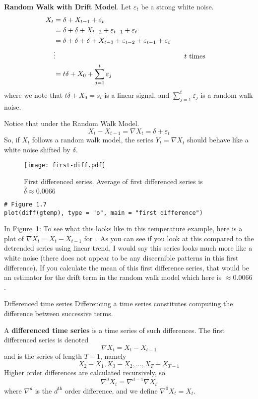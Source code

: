 \textbf{Random Walk with Drift Model}. Let $ \varepsilon_t $ be a strong white noise.
\begin{align*}
    X_t
     & =\delta+X_{t-1}+\varepsilon_t                                                                                  \\
     & =\delta+\delta+X_{t-2}+\varepsilon_{t-1}+\varepsilon_t                                                         \\
     & =\delta+\delta+\delta+X_{t-3}+\varepsilon_{t-2}+\varepsilon_{t-1}+\varepsilon_{t}                              \\
     & \vdots                                                                            & \quad & \text{$ t $ times} \\
     & =t\delta+X_0+\sum_{j=1}^{t} \varepsilon_j
\end{align*}
where we note that $ t\delta+X_0=s_t $ is a linear signal,
and $ \sum_{j=1}^{t} \varepsilon_j $ is a
random walk noise.

Notice that under the Random Walk Model.
\[ X_t-X_{t-1}=\nabla X_t=\delta+\varepsilon_t \]
So, if $ X_t $ follows a random walk model, the series $ Y_t=\nabla X_t $
should behave like a white noise shifted by $ \delta $.
\begin{figure}[!htbp]
    \centering
    \texttt{[image: first-diff.pdf]}
    \caption{First differenced series. Average of first differenced series
        is $ \hat{\delta}\approx 0.0066 $}\label{fig:firstdiff}
\end{figure}
\begin{verbatim}
# Figure 1.7
plot(diff(gtemp), type = "o", main = "first difference")
\end{verbatim}
In Figure~\ref{fig:firstdiff}:
{\color{blue}To see what this looks like in this temperature example, here is a plot
of $ \nabla X_t=X_t-X_{t-1} $ for~. As you can
see if you look at this compared to the detrended series using linear trend,
I would say this series looks much more like a white noise (there does not
appear to be any discernible patterns in this first difference). If you calculate the mean
of this first difference series, that would be an estimator for the drift term
in the random walk model which here is $ \approx 0.0066 $.}

\begin{Definition}{Differenced time series}{}
    Differencing a time series constitutes
    computing the difference between successive terms.

    A \textbf{differenced time series} is a time series of such differences.
    The first differenced series is denoted
    \[ \nabla X_t=X_t-X_{t-1} \]
    and is the series of length $ T-1 $, namely
    \[ X_2-X_1,X_3-X_2,\ldots,X_T-X_{T-1} \]
    Higher order differences are calculated recursively, so
    \[ \nabla^d X_t=\nabla^{d-1}\nabla X_t \]
    where $ \nabla^d $ is the $ d^{\text{th}} $ order difference, and
    we define $ \nabla^0 X_t=X_t $.
\end{Definition}

